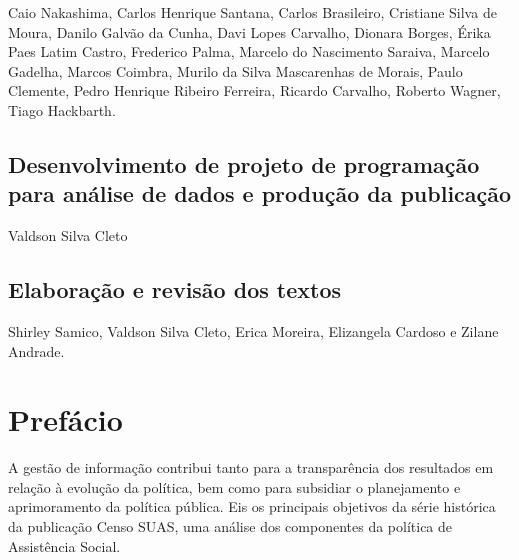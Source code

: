\documentclass[
  letterpaper,
  DIV=11,
  numbers=noendperiod]{scrreprt}
\begin{document}

Caio Nakashima, Carlos Henrique Santana, Carlos Brasileiro, Cristiane
Silva de Moura, Danilo Galvão da Cunha, Davi Lopes Carvalho, Dionara
Borges, Érika Paes Latim Castro, Frederico Palma, Marcelo do Nascimento
Saraiva, Marcelo Gadelha, Marcos Coimbra, Murilo da Silva Mascarenhas de
Morais, Paulo Clemente, Pedro Henrique Ribeiro Ferreira, Ricardo
Carvalho, Roberto Wagner, Tiago Hackbarth.

\section*{Desenvolvimento de projeto de programação para análise de
dados e produção da
publicação}\label{desenvolvimento-de-projeto-de-programauxe7uxe3o-para-anuxe1lise-de-dados-e-produuxe7uxe3o-da-publicauxe7uxe3o}


Valdson Silva Cleto

\section*{Elaboração e revisão dos
textos}\label{elaborauxe7uxe3o-e-revisuxe3o-dos-textos}


Shirley Samico, Valdson Silva Cleto, Erica Moreira, Elizangela Cardoso e
Zilane Andrade.


\chapter*{Prefácio}\label{prefuxe1cio}


A gestão de informação contribui tanto para a transparência dos
resultados em relação à evolução da política, bem como para subsidiar o
planejamento e aprimoramento da política pública. Eis os principais
objetivos da série histórica da publicação Censo SUAS, uma análise dos
componentes da política de Assistência Social.
\end{document}
